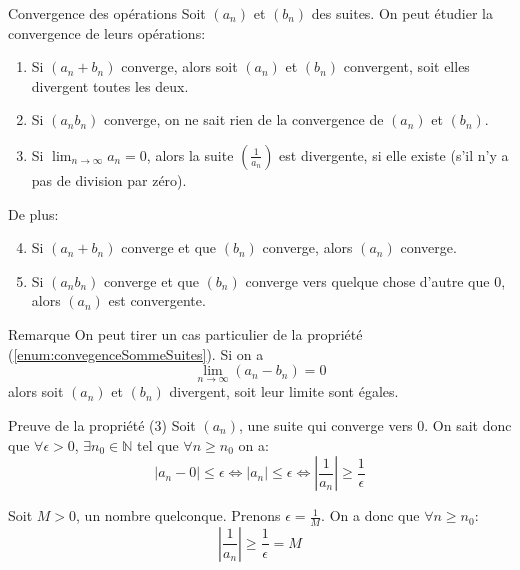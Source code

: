 \documentclass[a4paper]{article}
\begin{document}
\begin{parag}{Convergence des opérations}
    Soit $\left(a_n\right)$ et $\left(b_n\right)$ des suites. On peut étudier la convergence de leurs opérations:
    \begin{enumerate}
        \item\label{enum:convegenceSommeSuites} Si $\left(a_n + b_n\right)$ converge, alors soit $\left(a_n\right)$ et $\left(b_n\right)$ convergent, soit elles divergent toutes les deux.
        \item Si $\left(a_n b_n\right)$ converge, on ne sait rien de la convergence de $\left(a_n\right)$ et $\left(b_n\right)$.
        \item Si $\lim_{n \to \infty} a_n = 0$, alors la suite $\left(\frac{1}{a_n}\right)$ est divergente, si elle existe (s'il n'y a pas de division par zéro).
    \end{enumerate}

    De plus:
    \begin{enumerate}
        \setcounter{enumi}{3}
        \item Si $\left(a_n + b_n\right)$ converge et que $\left(b_n\right)$ converge, alors $\left(a_n\right)$ converge.
        \item Si $\left(a_n b_n\right)$ converge et que $\left(b_n\right)$ converge vers quelque chose d'autre que 0, alors $\left(a_n\right)$ est convergente.
    \end{enumerate}
    
    \begin{subparag}{Remarque}
        On peut tirer un cas particulier de la propriété (\ref{enum:convegenceSommeSuites}). Si on a 
        \[\lim_{n \to \infty} \left(a_n - b_n\right) = 0\]
        alors soit $\left(a_n\right)$ et $\left(b_n\right)$ divergent, soit leur limite sont égales.
    \end{subparag}
    
    \begin{subparag}{Preuve de la propriété (3)}
        Soit $\left(a_n\right)$, une suite qui converge vers 0. On sait donc que $\forall \epsilon > 0$, $\exists n_0 \in \mathbb{N}$ tel que $\forall n \geq n_0$ on a: 
        \[\left|a_n - 0\right| \leq \epsilon \iff \left|a_n\right| \leq \epsilon \iff \left|\frac{1}{a_n}\right| \geq \frac{1}{\epsilon}\]

        Soit $M > 0$, un nombre quelconque. Prenons $\epsilon = \frac{1}{M}$. On a donc que $\forall n \geq n_0$: 
        \[\left|\frac{1}{a_n}\right| \geq \frac{1}{\epsilon} = M\]


\end{subparag}
\end{parag}
\end{document}
